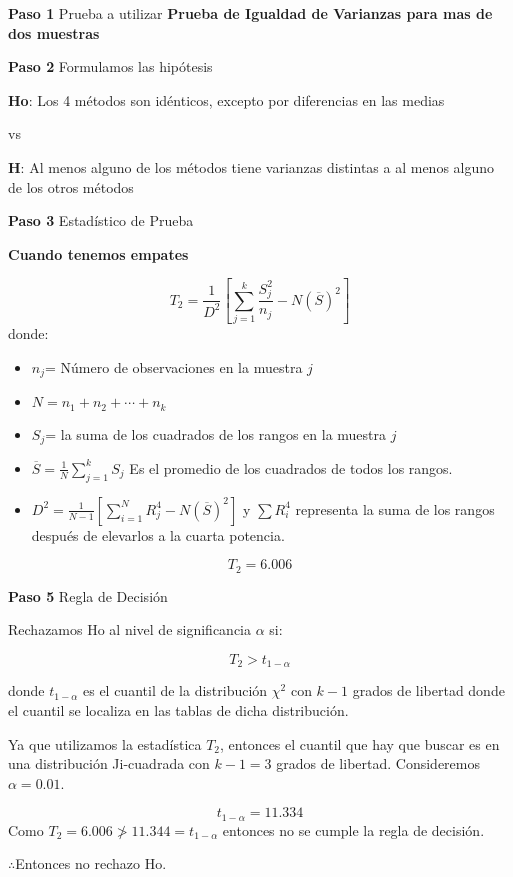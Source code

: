 \documentclass[a4paper,oneside,openany]{book}
\begin{document}
\textbf{Paso 1} Prueba a utilizar \textbf{Prueba de Igualdad de
Varianzas para mas de dos muestras}

\textbf{Paso 2} Formulamos las hipótesis

\textbf{Ho}: Los 4 métodos son idénticos, excepto por diferencias en las
medias

vs

\textbf{H}: Al menos alguno de los métodos tiene varianzas distintas a
al menos alguno de los otros métodos

\textbf{Paso 3} Estadístico de Prueba

\textbf{Cuando tenemos empates}

\[T_{2}= \frac{1}{D^2}\left[\sum_{j=1}^{k}\frac{S_{j}^2}{n_j}-N(\overline{S})^2\right]\]
donde:

\begin{itemize}
\item
  \(n_{j}\)= Número de observaciones en la muestra \(j\)
\item
  \(N= n_{1}+n_{2}+\cdots+n_{k}\)
\item
  \(S_{j}\)= la suma de los cuadrados de los rangos en la muestra \(j\)
\item
  \(\overline{S}= \frac{1}{N}\sum_{j=1}^{k}S_{j}\) Es el promedio de los
  cuadrados de todos los rangos.
\item
  \(D^2=\frac{1}{N-1}\left[\sum_{i=1}^{N}R^4_{j}-N(\overline{S})^2\right]\)
  y \(\sum{R_{i}^4}\) representa la suma de los rangos después de
  elevarlos a la cuarta potencia.
\end{itemize}

\[T_{2}=6.006\]

\textbf{Paso 5} Regla de Decisión

Rechazamos Ho al nivel de significancia \(\alpha\) si:

\[T_{2}>t_{1-\alpha}\]

donde \(t_{1-\alpha}\) es el cuantil de la distribución \(\chi^2\) con
\(k-1\) grados de libertad donde el cuantil se localiza en las tablas de
dicha distribución.

Ya que utilizamos la estadística \(T_2\), entonces el cuantil que hay
que buscar es en una distribución Ji-cuadrada con \(k-1=3\) grados de
libertad. Consideremos \(\alpha=0.01\).

\[t_{1-\alpha}=11.334\] Como \(T_2=6.006 \ngtr 11.344=t_{1-\alpha}\)
entonces no se cumple la regla de decisión.

\(\therefore\)Entonces no rechazo Ho.
\end{document}
